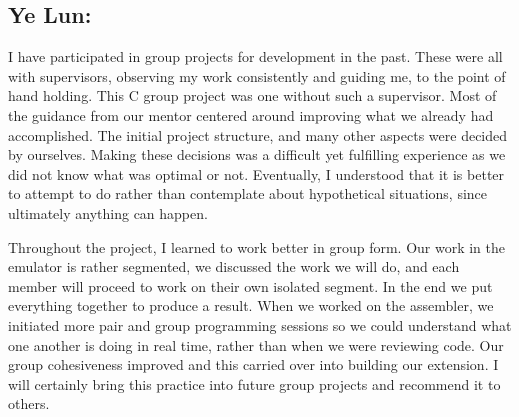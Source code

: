 \documentclass[a4paper]{article}
\begin{document}
\subsection{Ye Lun:}
I have participated in group projects for development in the past. These were all with supervisors, observing my work consistently and guiding me, to the point of hand holding. This C group project was one without such a supervisor. Most of the guidance from our mentor centered around improving what we already had accomplished. The initial project structure, and many other aspects were decided by ourselves. Making these decisions was a difficult yet fulfilling experience as we did not know what was optimal or not. Eventually, I understood that it is better to attempt to do rather than contemplate about hypothetical situations, since ultimately anything can happen.

Throughout the project, I learned to work better in group form. Our work in the emulator is rather segmented, we discussed the work we will do, and each member will proceed to work on their own isolated segment. In the end we put everything together to produce a result. When we worked on the assembler, we initiated more pair and group programming sessions so we could understand what one another is doing in real time, rather than when we were reviewing code. Our group cohesiveness improved and this carried over into building our extension. I will certainly bring this practice into future group projects and recommend it to others.
\end{document}
